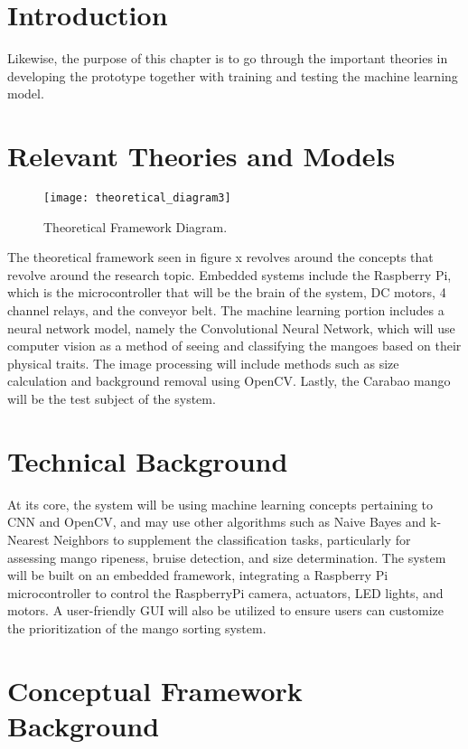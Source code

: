 

\section{Introduction}

Likewise, the purpose of this chapter is to go through the important theories in developing the prototype together with training and testing the machine learning model.

\section{Relevant Theories and Models}

\begin{figure}[!htbp]
	\centering
	\texttt{[image: theoretical\_diagram3]}
	\caption{Theoretical Framework Diagram.}
	\label{fig:theoreticalDiagram1}
\end{figure}


The theoretical framework seen in figure x revolves around the concepts that revolve around the research topic. 
Embedded systems include the Raspberry Pi, which is the microcontroller that will be the brain of the system, 
\gls{DC} motors, 4 channel relays, and the conveyor belt. The machine learning portion includes a neural network 
model, namely the Convolutional Neural Network, which will use computer vision as a method of seeing and classifying
 the mangoes based on their physical traits. The image processing will include methods such as size calculation and 
 background removal using OpenCV. Lastly, the Carabao mango will be the test subject of the system.

\section{Technical Background}

At its core, the system will be using machine learning concepts pertaining to \gls{CNN} and OpenCV, and may use other algorithms such as Naive Bayes and k-Nearest Neighbors to supplement the classification tasks, particularly for assessing mango ripeness, bruise detection, and size determination. The system will be built on an embedded framework, integrating a Raspberry Pi microcontroller to control the RaspberryPi camera, actuators, LED lights, and motors. A user-friendly GUI will also be utilized to ensure users can customize the prioritization of the mango sorting system.

\section{Conceptual Framework Background}

